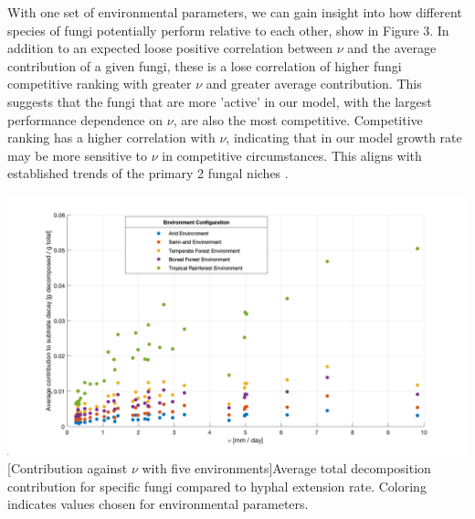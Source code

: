 \documentclass[12pt]{article}
\begin{document}
\begin{multicols}{2}
With one set of environmental parameters, we can gain insight into how different species of fungi potentially perform relative to each other, show in Figure 3. In addition to an expected loose positive correlation between $\nu$ and the average contribution of a given fungi, these is a lose correlation of higher fungi competitive ranking with greater $\nu$ and greater average contribution. This suggests that the fungi that are more 'active' in our model, with the largest performance dependence on $\nu$, are also the most competitive. Competitive ranking has a higher correlation with $\nu$, indicating that in our model growth rate may be more sensitive to $\nu$ in competitive circumstances. This aligns with established trends of the primary 2 fungal niches \cite{Maynard2019}.

\end{multicols}
\begin{center}\label{Environment Contributions}
\includegraphics[width=\linewidth]{avg_contr_nu_environment.png}
[Contribution against $\nu$ with five environments]{Average total decomposition contribution for specific fungi compared to hyphal extension rate. Coloring indicates values chosen for environmental parameters.}
\label{Fig 4.}
\end{center}
\end{document}
